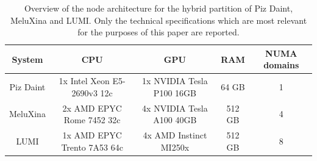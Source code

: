 \documentclass[main.tex]{subfiles}
\begin{document}
    \begin{table}[t!]
        \setlength\extrarowheight{2pt}
        \centering
        \begin{tabular}{|c|c|c|c|c|}
             \hline
             \textbf{System} & \textbf{CPU} & \textbf{GPU} & \textbf{RAM} & \textbf{NUMA domains} \\
             \hline
             Piz Daint & 1x Intel Xeon E5-2690v3 12c & 1x NVIDIA Tesla P100 16GB & 64 GB & 1 \\
             MeluXina & 2x AMD EPYC Rome 7452 32c & 4x NVIDIA Tesla A100 40GB & 512 GB & 4 \\
             LUMI & 1x AMD EPYC Trento 7A53 64c & 4x AMD Instinct MI250x & 512 GB & 8 \\
             \hline
        \end{tabular}
        \vspace*{0.2cm}
        \caption{Overview of the node architecture for the hybrid partition of Piz Daint, MeluXina and LUMI. Only the technical specifications which are most relevant for the purposes of this paper are reported.}
        \label{tab:architecture}
    \end{table}
\end{document}
